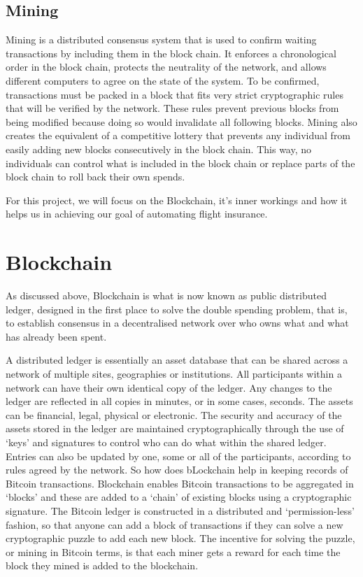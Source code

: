 \subsection{Mining}
Mining is a distributed consensus system that is used to confirm waiting transactions by including them in the block chain. It enforces a chronological order in the block chain, protects the neutrality of the network, and allows different computers to agree on the state of the system. To be confirmed, transactions must be packed in a block that fits very strict cryptographic rules that will be verified by the network. These rules prevent previous blocks from being modified because doing so would invalidate all following blocks. Mining also creates the equivalent of a competitive lottery that prevents any individual from easily adding new blocks consecutively in the block chain. This way, no individuals can control what is included in the block chain or replace parts of the block chain to roll back their own spends.

For this project, we will focus on the Blockchain, it's inner workings and how it helps us in achieving our goal of automating flight insurance.

\section{Blockchain}
As discussed above, Blockchain is what is now known as public distributed ledger, designed in the first place to solve the double spending problem, that is, to establish consensus in a decentralised network over who owns what and what has already been spent\cite{Nakamoto2008Bitcoin:System}. 

A distributed ledger is essentially an asset database that can be shared across a network of multiple sites, geographies or institutions. All participants within a network can have their own identical copy of the ledger. Any changes to the ledger are reflected in all copies in minutes, or in some cases, seconds. The assets can be financial, legal, physical or electronic. The security and accuracy of the assets stored in the ledger are maintained cryptographically through the use of ‘keys’ and signatures to control who can do what within the shared ledger. Entries can also be updated by one, some or all of the participants, according to rules agreed by the network.\cite{Walport2015DistributedChain}
So how does bLockchain help in keeping records of Bitcoin transactions.  Blockchain enables Bitcoin transactions to be aggregated in ‘blocks’ and these are added to a ‘chain’ of existing blocks using a cryptographic signature. The Bitcoin ledger is constructed in a distributed and ‘permission-less’ fashion, so that anyone can add a block of transactions if they can solve a new cryptographic puzzle to add each new block. The incentive for solving the puzzle, or mining in Bitcoin terms, is that each miner gets a reward for each time the block they mined is added to the blockchain.\cite{Nakamoto2008Bitcoin:System}

